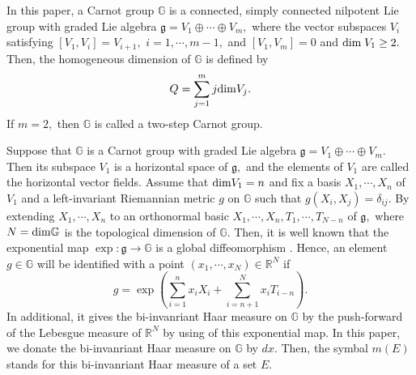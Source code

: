 \documentclass[11pt,twoside]{article}
\theoremstyle{definition}
\theoremstyle{remark}
\begin{document}
 In this paper, a Carnot group $\mathbb{G}$  \cite{FS82, Pan89} is a connected, simply connected nilpotent Lie group with graded Lie algebra 
$\mathfrak{g}=V_{1}\oplus\cdots\oplus V_{m},$ where the vector subspaces $V_{i}$ satisfying $[V_{1},V_{i}]=V_{i+1},$ $i=1,\cdots,m-1,$ and 
$[V_{1},V_{m}]=0$ and ${\rm dim}\;V_{1}\geq2.$  Then, the homogeneous dimension of $\mathbb{G}$ is  defined by 
$$Q=\sum_{j=1}^{m}j{\rm dim}V_{j}.$$ 
 If $m=2,$ then $\mathbb{G}$ is called a two-step Carnot group.

Suppose that  $\mathbb{G}$ is a Carnot group with graded Lie algebra $\mathfrak{g}=V_{1}\oplus\cdots\oplus V_{m}.$ Then its subspace $V_{1}$ is a horizontal space of $\mathfrak{g},$ and the elements of $V_{1}$ are called the horizontal vector fields. Assume that ${\rm dim}V_{1}=n$ and fix a basis $X_{1},\cdots,X_{n}$ of $V_{1}$ and a left-invariant Riemannian metric $g$ on $\mathbb{G}$ such that $g(X_{i},X_{j})=\delta_{ij}.$ By extending $X_{1},\cdots,X_{n}$ to an orthonormal basic $X_{1},\cdots,X_{n}, T_{1},\cdots,T_{N-n}$ of $\mathfrak{g},$ where $N={\rm dim}\mathbb{G}$
is the topological dimension of $\mathbb{G}.$ Then, it is well known that the exponential map $\exp:\mathfrak{g}\rightarrow\mathbb{G}$ is a global diffeomorphism \cite{FS82}. Hence, an element $g\in \mathbb{G}$ will be identified with a point $(x_{1},\cdots,x_{N})\in \mathbb{R}^{N}$ if $$g=\exp\left(\sum_{i=1}^{n}x_{i}X_{i}+\sum_{i=n+1}^{N}x_{i}T_{i-n}\right).$$
In additional, it gives the bi-invanriant Haar measure on $\mathbb{G}$ by the push-forward of the Lebesgue measure of $\mathbb{R}^{N}$ by using of this exponential map. In this paper, we donate the  bi-invanriant Haar measure on $\mathbb{G}$ by $dx.$ Then, the symbal $m(E)$ stands for this bi-invanriant Haar measure of a set $E.$ 
\end{document}
